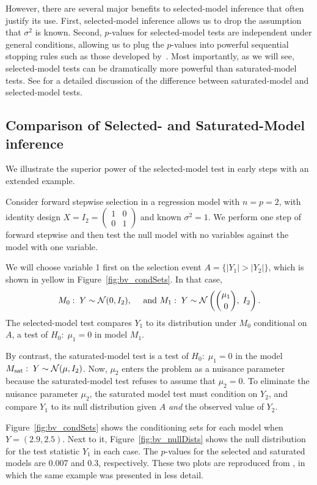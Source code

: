 \documentclass{article}
\begin{document}
However, there are several major benefits to selected-model inference that often justify its use. First, selected-model inference allows us to drop the assumption that $\sigma^2$ is known. Second, $p$-values for selected-model tests are independent under general conditions, allowing us to plug the $p$-values into powerful sequential stopping rules such as those developed by~\citet{gsell2013sequential}. Most importantly, as we will see, selected-model tests can be dramatically more powerful than saturated-model tests. See \citet[][Section 5]{fithian2014optimal} for a detailed discussion of the difference between saturated-model and selected-model tests.


\subsection{Comparison of Selected- and Saturated-Model inference}\label{sec:bivariate}

We illustrate the superior power of the selected-model test in early steps with an extended example.

\begin{example}\label{ex:bivariate}
  Consider forward stepwise selection in a regression model with $n=p=2$, with identity design $X = I_2=\begin{pmatrix} 1 & 0 \\ 0 & 1\end{pmatrix}$ and known $\sigma^2=1$. We perform one step of forward stepwise and then test the null model with no variables against the model with one variable. 

We will choose variable 1 first on the selection event $A=\{|Y_1| > |Y_2|\}$, which is shown in yellow in Figure~\ref{fig:bv_condSets}. In that case,
\[
M_0:\; Y\sim \mathcal{N}(0,I_2), \quad\text{ and } 
M_1:\; Y \sim \mathcal{N}\left(\binom{\mu_1}{0}, \; I_2\right).
\]
The selected-model test compares $Y_1$ to its distribution under $M_0$ conditional on $A$, a test of $H_0:\;\mu_1=0$ in model $M_1$.

By contrast, the saturated-model test is a test of $H_0:\; \mu_1=0$ in the model $M_{\text{sat}}:\; Y \sim \mathcal{N}(\mu, I_2)$. Now, $\mu_2$ enters the problem as a nuisance parameter because the saturated-model test refuses to assume that $\mu_2=0$. To eliminate the nuisance parameter $\mu_2$, the saturated model test must condition on $Y_2$, and compare $Y_1$ to its null distribution given $A$ {\em and} the observed value of $Y_2$.

Figure~\ref{fig:bv_condSets} shows the conditioning sets for each model when $Y=(2.9,2.5)$. Next to it, Figure~\ref{fig:bv_nullDists} shows the null distribution for the test statistic $Y_1$ in each case. The $p$-values for the selected and saturated models are 0.007 and 0.3, respectively. These two plots are reproduced from \citet{fithian2014optimal}, in which the same example was presented in less detail.
\end{example}
\end{document}
